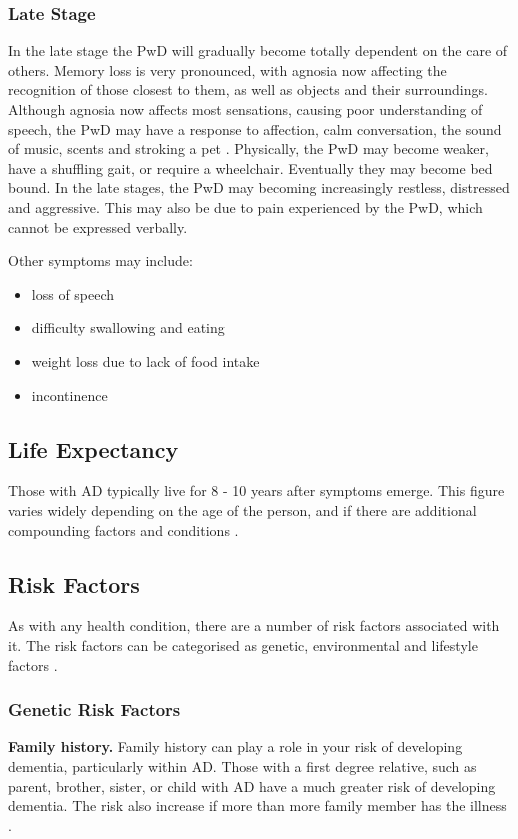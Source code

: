 \subsubsection{Late Stage}
In the late stage the PwD will gradually become totally dependent on the care of others. Memory loss is very pronounced, with agnosia now affecting the recognition of those closest to them, as well as objects and their surroundings. Although agnosia now affects most sensations, causing poor understanding of speech, the PwD may have a response to affection, calm conversation, the sound of music, scents and stroking a pet \cite{Grout2015}.
Physically, the PwD may become weaker, have a shuffling gait, or require a wheelchair. Eventually they may become bed bound. In the late stages, the PwD may becoming increasingly restless, distressed and aggressive. This may also be due to pain experienced by the PwD, which cannot be expressed verbally.

Other symptoms may include:
\begin{itemize}[noitemsep,topsep=0pt]
\item loss of speech
\item difficulty swallowing and eating
\item weight loss due to lack of food intake
\item incontinence
\end{itemize}

\subsection{Life Expectancy}
Those with AD typically live for 8 - 10 years after symptoms emerge. This figure varies widely depending on the age of the person, and if there are additional compounding factors and conditions \cite{Grout2015}.

\subsection{Risk Factors}
As with any health condition, there are a number of risk factors associated with it. The risk factors can be categorised as genetic, environmental and lifestyle factors \cite{Deckers2015, Norton2015-TRCI}.

\subsubsection{Genetic Risk Factors}
\textbf{Family history.}
Family history can play a role in your risk of developing dementia, particularly within AD. Those with a first degree relative, such as parent, brother, sister, or child with AD have a much greater risk of developing dementia. The risk also increase if more than more family member has the illness \cite{AlzheimersAssociation2015b}.

